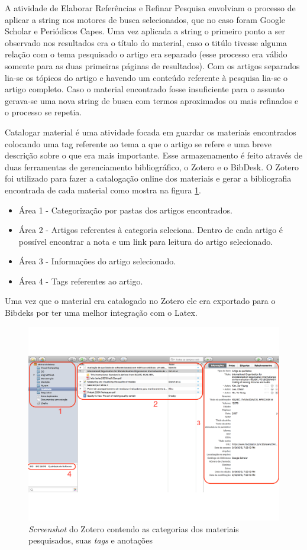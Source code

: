A atividade de Elaborar Referências e Refinar Pesquisa envolviam o processo de aplicar a string nos motores de busca selecionados, que no caso foram Google Scholar e Periódicos Capes. Uma vez aplicada a string o primeiro ponto a ser observado nos resultados era o título do material, caso o titúlo tivesse alguma relação com o tema pesquisado o artigo era separado (esse processo era válido somente para as duas primeiras páginas de resultados). Com os artigos separados lia-se os tópicos do artigo e havendo um conteúdo referente à pesquisa lia-se o artigo completo. Caso o  material encontrado fosse insuficiente para o assunto gerava-se uma nova string de busca com termos aproximados ou mais refinados e o processo se repetia.

Catalogar material é uma atividade focada em guardar os materiais encontrados colocando uma tag referente ao tema a que o artigo se refere e uma breve descrição sobre o que era mais importante. Esse armazenamento é feito através de duas ferramentas de gerenciamento bibliográfico, o Zotero e o BibDesk. O Zotero foi utilizado para fazer a catalogação online dos materiais e gerar a bibliografia encontrada de cada material como mostra na figura \ref{img:zotero}.
\begin{itemize}
\item Área 1 - Categorização por pastas dos artigos encontrados.
\item Área 2 - Artigos referentes à categoria seleciona. Dentro de cada artigo é possível encontrar a nota e um link para leitura do artigo selecionado.
\item Área 3 - Informações do artigo selecionado.
\item Área 4 - Tags referentes ao artigo.
\end{itemize}
Uma vez que o material era catalogado no Zotero ele era exportado para o Bibdeks por ter uma melhor integração com o Latex.
\graphicspath{{figuras/}}
\begin{figure}[h]
\centering
\includegraphics[scale=0.50]{zotero_edit2}
\caption{\textit{Screenshot} do Zotero contendo as categorias dos materiais pesquisados, suas \textit{tags} e anotações}
\label{img:zotero}
\end{figure}
